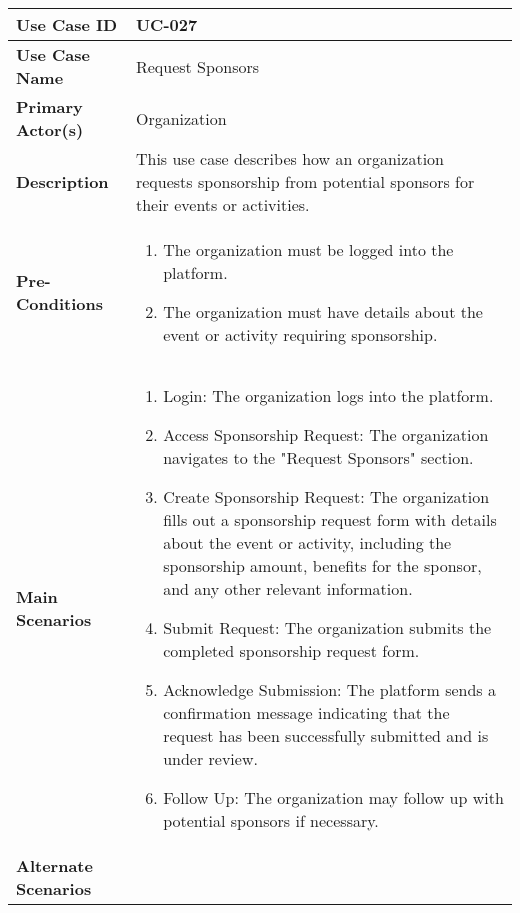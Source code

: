 \begin{table}[!ht]
    \centering
    \renewcommand{\arraystretch}{1.3} %
    \begin{tabularx}{\textwidth}{|l|X|}
        \hline
        \textbf{Use Case ID} & UC-027 \\
        \hline
        \textbf{Use Case Name} & Request Sponsors \\
        \hline
        \textbf{Primary Actor(s)} & Organization \\
        \hline
        \textbf{Description} & This use case describes how an organization requests sponsorship from potential sponsors for their events or activities. \\
        \hline
        \textbf{Pre-Conditions} & 
        \begin{enumerate}[label=\arabic*.,itemsep=0pt]
            \item The organization must be logged into the platform.
            \item The organization must have details about the event or activity requiring sponsorship.
        \end{enumerate} \\
        \hline
        \textbf{Main Scenarios} & 
        \begin{enumerate}[label=\arabic*.,itemsep=0pt]
            \item Login: The organization logs into the platform.
            \item Access Sponsorship Request: The organization navigates to the "Request Sponsors" section.
            \item Create Sponsorship Request: The organization fills out a sponsorship request form with details about the event or activity, including the sponsorship amount, benefits for the sponsor, and any other relevant information.
            \item Submit Request: The organization submits the completed sponsorship request form.
            \item Acknowledge Submission: The platform sends a confirmation message indicating that the request has been successfully submitted and is under review.
            \item Follow Up: The organization may follow up with potential sponsors if necessary.
        \end{enumerate} \\
        \hline
        \textbf{Alternate Scenarios} & 
        \begin{itemize}[label=--,itemsep=0pt]

\end{itemize}
\end{tabularx}
\end{table}
